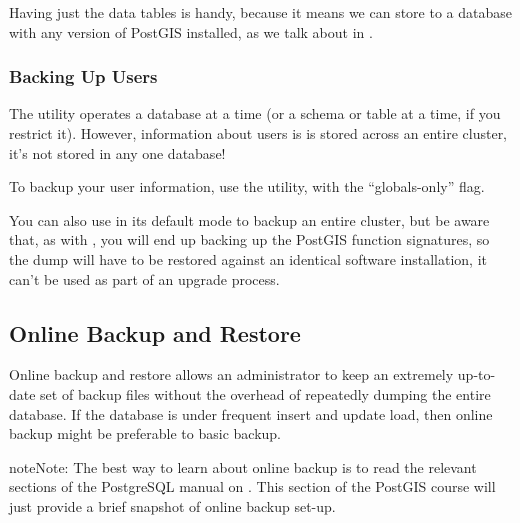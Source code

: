 \documentclass[a4paper,11pt,english]{sphinxmanual}
\begin{document}
Having just the data tables is handy, because it means we can store to a database with any version of PostGIS installed, as we talk about in .


\subsubsection{Backing Up Users}
\label{\detokenize{maintenance:backing-up-users}}
The  utility operates a database at a time (or a schema or table at a time, if you restrict it). However, information about users is is stored across an entire cluster, it’s not stored in any one database!

To backup your user information, use the  utility, with the “\textendash{}globals-only” flag.

\begin{sphinxVerbatim}[commandchars=\\\{\}]
   
\end{sphinxVerbatim}

You can also use  in its default mode to backup an entire cluster, but be aware that, as with , you will end up backing up the PostGIS function signatures, so the dump will have to be restored against an identical software installation, it can’t be used as part of an upgrade process.


\subsection{Online Backup and Restore}
\label{\detokenize{maintenance:online-backup-and-restore}}
Online backup and restore allows an administrator to keep an extremely up-to-date set of backup files without the overhead of repeatedly dumping the entire database. If the database is under frequent insert and update load, then online backup might be preferable to basic backup.

\begin{sphinxadmonition}{note}{Note:}
The best way to learn about online backup is to read the relevant sections of the PostgreSQL manual on . This section of the PostGIS course will just provide a brief snapshot of online backup set-up.
\end{sphinxadmonition}
\end{document}
